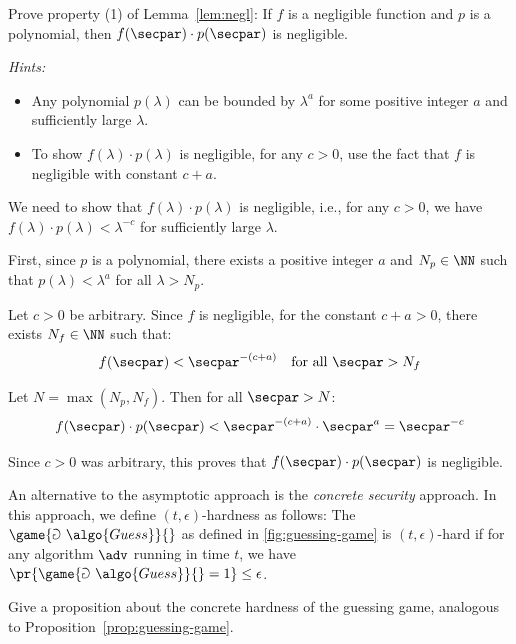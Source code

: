 \begin{exercise}[Optional]\label{ex:negl-property-proof}
  Prove property (1) of Lemma~\ref{lem:negl}: If $f$ is a negligible function and $p$ is a polynomial, then $f(\secpar) \cdot p(\secpar)$ is negligible.
  
  \emph{Hints:}
  \begin{itemize}
    \item Any polynomial $p(\lambda)$ can be bounded by $\lambda^{a}$ for some positive integer $a$ and sufficiently large $\lambda$.
    \item To show $f(\lambda) \cdot p(\lambda)$ is negligible, for any $c > 0$, use the fact that $f$ is negligible with constant $c + a$.
  \end{itemize}
\end{exercise}

\ifsolutions
\begin{mysolution}
  We need to show that $f(\lambda) \cdot p(\lambda)$ is negligible, i.e., for any $c > 0$, we have $f(\lambda) \cdot p(\lambda) < \lambda^{-c}$ for sufficiently large $\lambda$.
  
  First, since $p$ is a polynomial, there exists a positive integer $a$ and $N_p \in \NN$ such that $p(\lambda) < \lambda^{a}$ for all $\lambda > N_p$.
  
  Let $c > 0$ be arbitrary. Since $f$ is negligible, for the constant $c + a > 0$, there exists $N_f \in \NN$ such that:
  \[
  f(\secpar) < \secpar^{-(c+a)} \quad \text{for all } \secpar > N_f
  \]
  
  Let $N = \max(N_p, N_f)$. Then for all $\secpar > N$:
  \[
  f(\secpar) \cdot p(\secpar) < \secpar^{-(c+a)} \cdot \secpar^{a} = \secpar^{-c}
  \]
  
  Since $c > 0$ was arbitrary, this proves that $f(\secpar) \cdot p(\secpar)$ is negligible.
\end{mysolution}
\fi

\begin{exercise}[Optional]\label{ex:concrete-security}
  An alternative to the asymptotic approach is the \emph{concrete security} approach.
  In this approach, we define $(t,\epsilon)$-hardness as follows:
  The $\game{\Game~\algo{Guess}}{}$ as defined in \autoref{fig:guessing-game} is $(t,\epsilon)$-hard if for any algorithm $\adv$ running in time $t$, we have $\pr{\game{\Game~\algo{Guess}}{} = 1} \le \epsilon$.
  
  Give a proposition about the concrete hardness of the guessing game, analogous to Proposition~\ref{prop:guessing-game}.
\end{exercise}

